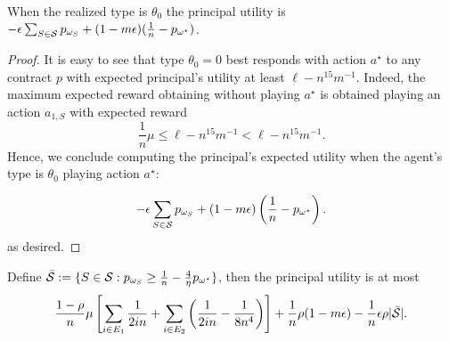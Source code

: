\begin{lemma}\label{lem:onlyif4}
    When the realized type is $\theta_0$ the principal utility is $-\epsilon\sum_{S\in\mathcal{S}}p_{\omega_S}+(1-m\epsilon)(\frac{1}{n}-p_{\omega^\star})$.
\end{lemma}
\begin{proof}
    It is easy to see that type $\theta_0=0$ best responds with action $a^\star$  to any contract $p$ with expected principal's utility at least $\ell-n^{15}m^{-1}$. 
    Indeed, the maximum expected reward obtaining without playing $a^\star$ is obtained playing an action $a_{1,S}$ with expected reward
    \[ 
    \frac{1}{n} \mu \le \ell-n^{15}m^{-1}< \ell-n^{15}m^{-1}.  
    \]
%
    Hence, we conclude computing the principal's expected utility when the agent's type is $\theta_0$ playing action $a^\star$:
    
	\begin{align*}\label{eq:bound0}
	-\epsilon\sum_{S\in\mathcal{S}}p_{\omega_S}+(1-m\epsilon)\left(\frac{1}{n}-p_{\omega^\star}\right).
	\end{align*}
    as desired.
\end{proof}


\begin{lemma}\label{lem:onlyif5}
Define 	$\bar {\mathcal{S}}:=\{S\in\mathcal{S}: p_{\omega_S}\ge\frac{1}{n}-\frac{4}{\eta}p_{\omega^\star}\}$, then the principal utility is at most
    \[
        \frac{1-\rho}{n}\mu\left[\sum_{i\in E_1}\frac{1}{2in}+\sum_{i\in E_2}\left(\frac{1}{2in}-\frac{1}{8n^4}\right)\right]+\frac{1}{n}\rho(1-m\epsilon)-\frac{1}{n}\epsilon\rho|\bar{\mathcal{S}}|.
    \]
\end{lemma}


